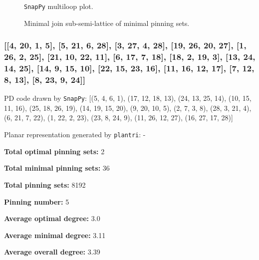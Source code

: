 \documentclass{article}%
\begin{document}
\begin{multicols}{2}
\begin{figure}[H]
\centering

\caption{\texttt{SnapPy} multiloop plot.}
\label{fig:tex/img/[[14, 28, 1, 15], [15, 7, 16, 8], [8, 13, 9, 14], [9, 27, 10, 28], [1, 10, 2, 11], [11, 6, 12, 7], [16, 12, 17, 13], [26, 21, 27, 22], [2, 21, 3, 20], [5, 23, 6, 24], [17, 23, 18, 22], [25, 3, 26, 4],.svg}
\end{figure}
\columnbreak

\begin{figure}[H]
\centering
\scalebox{0.8}{}
\caption{Minimal join sub-semi-lattice of minimal pinning sets.}
\label{fig:tex/img/[[14, 28, 1, 15], [15, 7, 16, 8], [8, 13, 9, 14], [9, 27, 10, 28], [1, 10, 2, 11], [11, 6, 12, 7], [16, 12, 17, 13], [26, 21, 27, 22], [2, 21, 3, 20], [5, 23, 6, 24], [17, 23, 18, 22], [25, 3, 26, 4],.pgf}
\end{figure}
\end{multicols}

\newpage

\subsubsection{[[4, 20, 1, 5], [5, 21, 6, 28], [3, 27, 4, 28], [19, 26, 20, 27], [1, 26, 2, 25], [21, 10, 22, 11], [6, 17, 7, 18], [18, 2, 19, 3], [13, 24, 14, 25], [14, 9, 15, 10], [22, 15, 23, 16], [11, 16, 12, 17], [7, 12, 8, 13], [8, 23, 9, 24]]}

{\small\noindent PD code drawn by \texttt{SnapPy}: [(5, 4, 6, 1), (17, 12, 18, 13), (24, 13, 25, 14), (10, 15, 11, 16), (25, 18, 26, 19), (14, 19, 15, 20), (9, 20, 10, 5), (2, 7, 3, 8), (28, 3, 21, 4), (6, 21, 7, 22), (1, 22, 2, 23), (23, 8, 24, 9), (11, 26, 12, 27), (16, 27, 17, 28)]}

{\small\noindent Planar representation generated by \texttt{plantri}: -}

\begin{multicols}{2}
{\normalsize \noindent\textbf{Total optimal pinning sets:} 2

\noindent\textbf{Total minimal pinning sets:} 36

\noindent\textbf{Total pinning sets:} 8192

\noindent\textbf{Pinning number:} 5

}
\columnbreak

{\normalsize \noindent\textbf{Average optimal degree:} 3.0

\noindent\textbf{Average minimal degree:} 3.11

\noindent\textbf{Average overall degree:} 3.39

}
\end{multicols}
\end{document}
